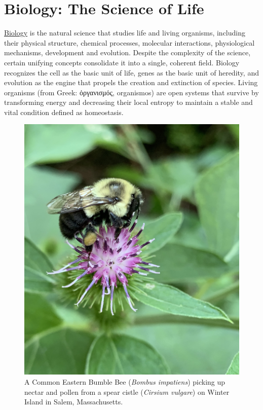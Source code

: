 \hypertarget{biology-the-science-of-life}{%
\chapter{Biology: The Science of Life}\label{biology-the-science-of-life}}

\href{https://en.wikipedia.org/wiki/Biology}{Biology} is the natural science that studies life and living organisms, including their physical structure, chemical processes, molecular interactions, physiological mechanisms, development and evolution. Despite the complexity of the science, certain unifying concepts consolidate it into a single, coherent field. Biology recognizes the cell as the basic unit of life, genes as the basic unit of heredity, and evolution as the engine that propels the creation and extinction of species. Living organisms (from Greek: ὀργανισμός, organismos) are open systems that survive by transforming energy and decreasing their local entropy to maintain a stable and vital condition defined as homeostasis.



\begin{figure}

{\centering \includegraphics[width=0.7\linewidth]{./figures/life/IMG_1024} 

}

\caption{A Common Eastern Bumble Bee (\emph{Bombus impatiens}) picking up nectar and pollen from a spear cistle (\emph{Cirsium vulgare}) on Winter Island in Salem, Massachusetts.}\label{fig:bumblebee}
\end{figure}

